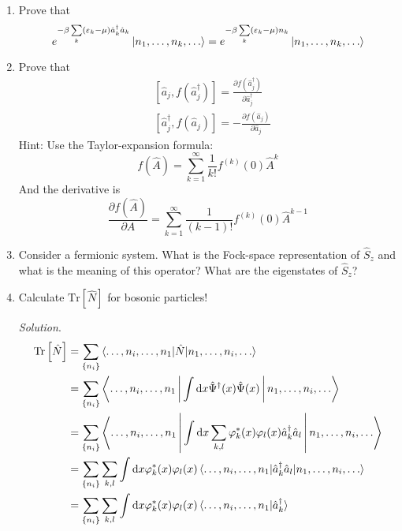 \documentclass[11pt, a4paper]{article}
\newcommand{\dd}{\mathrm{d}}
\newcommand{\Tr}[1]{\mathrm{Tr}\left[#1\right]}
\begin{document}
\begin{enumerate}
    \item Prove that 
    \begin{equation*}
        e^{-\beta\sum\limits_k(\varepsilon_k - \mu)\hat a_k^{\dagger}\hat a_k}\ket{n_1, \dots, n_k, \dots}
        = e^{-\beta\sum\limits_k(\varepsilon_k - \mu)n_k}\ket{n_1, \dots, n_k, \dots}
    \end{equation*}
    \item Prove that 
    \begin{align*}
        &[\hat a_j, f(\hat a_j^{\dagger})] = \frac{\partial f(\hat a_j^{\dagger})}{\partial \hat a_j^{\dagger}}\\
        &[\hat a_j^{\dagger}, f(\hat a_j)] = -\frac{\partial f(\hat a_j)}{\partial \hat a_j}
    \end{align*}
    Hint: Use the Taylor-expansion formula:
    \begin{equation*}
        f(\hat A) = \sum\limits_{k=1}^{\infty} \frac{1}{k!}f^{(k)}(0)\hat A^k
    \end{equation*}
    And the derivative is 
    \begin{equation*}
        \frac{\partial f(\hat A)}{\partial A} = \sum\limits_{k=1}^{\infty} \frac{1}{(k-1)!}f^{(k)}(0)\hat A^{k-1}
    \end{equation*}
    \item Consider a fermionic system. What is the Fock-space representation of $\hat S_z$ and what is the meaning
    of this operator? What are the eigenstates of $\hat S_z$?
    \item Calculate $\Tr {\hat N}$ for bosonic particles!
    \par\textit{Solution}.
    \begin{align*}
        \Tr{\hat N} &= \sum\limits_{\{n_i\}}\braket{\dots,n_i,\dots,n_1 | \hat N |n_1, \dots, n_i, \dots} \\
        & = \sum\limits_{\{n_i\}}\Braket{\dots,n_i,\dots,n_1 | \int\dd x \hat\Psi^{\dagger}(x)\hat\Psi(x) |n_1, \dots, n_i, \dots} \\
        & = \sum\limits_{\{n_i\}}\Braket{\dots,n_i,\dots,n_1 | \int\dd x \sum\limits_{k,l}\varphi^*_k(x)\varphi_l(x)
        \hat a_k^{\dagger}\hat a_l |n_1, \dots, n_i, \dots} \\
        & = \sum\limits_{\{n_i\}}\sum\limits_{k,l}\int\dd x \varphi^*_k(x)\varphi_l(x) \braket{\dots,n_i,\dots,n_1 | \hat a_k^{\dagger}\hat a_l |n_1, \dots, n_i, \dots} \\
        & = \sum\limits_{\{n_i\}}\sum\limits_{k,l}\int\dd x \varphi^*_k(x)\varphi_l(x) \braket{\dots,n_i,\dots,n_1 | \hat a_k^{\dagger}
}
\end{align*}
\end{enumerate}
\end{document}
